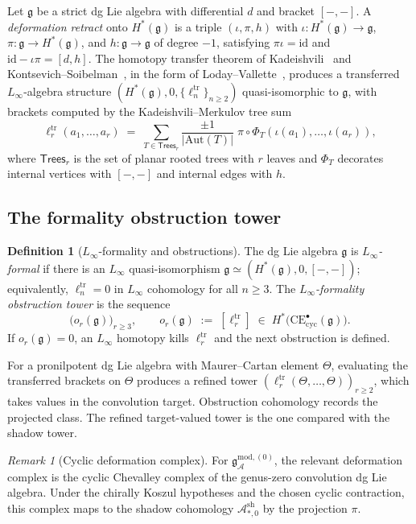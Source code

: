 \documentclass[11pt,reqno]{amsart}
\theoremstyle{definition}
\newtheorem{definition}[theorem]{Definition}
\theoremstyle{remark}
\newtheorem{remark}[theorem]{Remark}
\providecommand{\cA}{\mathcal{A}}
\providecommand{\CE}{\mathrm{CE}}
\providecommand{\Aut}{\mathrm{Aut}}
\providecommand{\fg}{\mathfrak{g}}
\providecommand{\gmodzero}{\mathfrak{g}^{\mathrm{mod},(0)}_{\cA}}
\providecommand{\Ash}{\cA^{\mathrm{sh}}}
\providecommand{\Linf}{L_\infty}
\providecommand{\Trees}{\mathsf{Trees}}
\numberwithin{equation}{section}
\begin{document}
Let $\fg$ be a strict dg Lie algebra with differential $d$ and
bracket $[-,-]$. A \emph{deformation retract} onto $H^*(\fg)$ is
a triple $(\iota,\pi,h)$ with
$\iota\colon H^*(\fg)\to\fg$,
$\pi\colon\fg\to H^*(\fg)$, and $h\colon\fg\to\fg$ of degree
$-1$, satisfying $\pi\iota=\mathrm{id}$ and
$\mathrm{id}-\iota\pi=[d,h]$.
The homotopy transfer theorem of Kadeishvili~\cite{Kadeishvili80}
and Kontsevich--Soibelman~\cite{KontsevichSoibelman00}, in the
form of Loday--Vallette~\cite[\S10.3]{LodayVallette12}, produces
a transferred $\Linf$-algebra structure
$(H^*(\fg),0,\{\ell_n^{\mathrm{tr}}\}_{n\ge 2})$ quasi-isomorphic
to $\fg$, with brackets computed by the Kadeishvili--Merkulov
tree sum
\begin{equation}\label{eq:tree-formula}
\ell_r^{\mathrm{tr}}(a_1,\dots,a_r)
\;=\;
\sum_{T\in\Trees_r}\frac{\pm 1}{|\Aut(T)|}\;
\pi\circ\Phi_T(\iota(a_1),\dots,\iota(a_r)),
\end{equation}
where $\Trees_r$ is the set of planar rooted trees with $r$
leaves and $\Phi_T$ decorates internal vertices with $[-,-]$
and internal edges with $h$.

\subsection{The formality obstruction tower}

\begin{definition}[$\Linf$-formality and obstructions]
\label{def:formality-tower}
The dg Lie algebra $\fg$ is \emph{$\Linf$-formal} if there is an
$\Linf$ quasi-isomorphism $\fg\simeq(H^*(\fg),0,[-,-])$;
equivalently, $\ell_n^{\mathrm{tr}}=0$ in $\Linf$ cohomology for
all $n\ge 3$. The \emph{$\Linf$-formality obstruction tower} is
the sequence
\[
\bigl(o_r(\fg)\bigr)_{r\ge 3},\qquad
o_r(\fg)\;:=\;[\ell_r^{\mathrm{tr}}]\;\in\;
H^*\bigl(\CE^\bullet_{\mathrm{cyc}}(\fg)\bigr).
\]
If $o_r(\fg)=0$, an $\Linf$ homotopy kills
$\ell_r^{\mathrm{tr}}$ and the next obstruction is defined.
\end{definition}

For a pronilpotent dg Lie algebra with Maurer--Cartan element
$\Theta$, evaluating the transferred brackets on $\Theta$
produces a refined tower
$(\ell_r^{\mathrm{tr}}(\Theta,\dots,\Theta))_{r\ge 2}$, which
takes values in the convolution target.  Obstruction cohomology
records the projected class.  The refined target-valued tower is
the one compared with the shadow tower.

\begin{remark}[Cyclic deformation complex]
For $\gmodzero$, the relevant deformation complex is the cyclic
Chevalley complex of the genus-zero convolution dg Lie algebra.
Under the chirally Koszul hypotheses and the chosen cyclic
contraction, this complex maps to the shadow cohomology
$\Ash_{*,0}$ by the projection $\pi$.
\end{remark}
\end{document}
